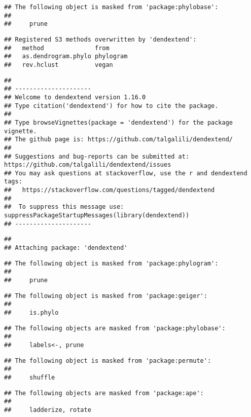 \documentclass[
]{article}
\begin{document}
\begin{verbatim}
## The following object is masked from 'package:phylobase':
## 
##     prune
\end{verbatim}

\begin{verbatim}
## Registered S3 methods overwritten by 'dendextend':
##   method              from     
##   as.dendrogram.phylo phylogram
##   rev.hclust          vegan
\end{verbatim}

\begin{verbatim}
## 
## ---------------------
## Welcome to dendextend version 1.16.0
## Type citation('dendextend') for how to cite the package.
## 
## Type browseVignettes(package = 'dendextend') for the package vignette.
## The github page is: https://github.com/talgalili/dendextend/
## 
## Suggestions and bug-reports can be submitted at: https://github.com/talgalili/dendextend/issues
## You may ask questions at stackoverflow, use the r and dendextend tags: 
##   https://stackoverflow.com/questions/tagged/dendextend
## 
##  To suppress this message use:  suppressPackageStartupMessages(library(dendextend))
## ---------------------
\end{verbatim}

\begin{verbatim}
## 
## Attaching package: 'dendextend'
\end{verbatim}

\begin{verbatim}
## The following object is masked from 'package:phylogram':
## 
##     prune
\end{verbatim}

\begin{verbatim}
## The following object is masked from 'package:geiger':
## 
##     is.phylo
\end{verbatim}

\begin{verbatim}
## The following objects are masked from 'package:phylobase':
## 
##     labels<-, prune
\end{verbatim}

\begin{verbatim}
## The following object is masked from 'package:permute':
## 
##     shuffle
\end{verbatim}

\begin{verbatim}
## The following objects are masked from 'package:ape':
## 
##     ladderize, rotate
\end{verbatim}
\end{document}
